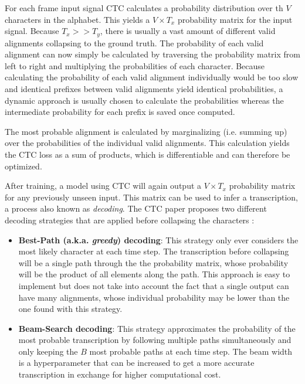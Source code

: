 For each frame input signal \ac{CTC} calculates a probability distribution over th $V$ characters in the alphabet. This yields a $V \times T_x$ probability matrix for the input signal. Because $T_x >> T_y$, there is usually a vast amount of different valid alignments collapsing to the ground truth. The probability of each valid alignment can now simply be calculated by traversing the probability matrix from left to right and multiplying the probabilities of each character. Because calculating the probability of each valid alignment individually would be too slow and identical prefixes between valid alignments yield identical probabilities, a dynamic approach is usually chosen to calculate the probabilities whereas the intermediate probability for each prefix is saved once computed.

The most probable alignment is calculated by marginalizing (i.e. summing up) over the probabilities of the individual valid alignments. This calculation yields the CTC loss as a sum of products, which is differentiable and can therefore be optimized.

After training, a model using \ac{CTC} will again output a $V \times T_x$ probability matrix for any previously unseen input. This matrix can be used to infer a transcription, a process also known as \textit{decoding}. The \ac{CTC} paper proposes two different decoding strategies that are applied before collapsing the characters \cite{ctc_paper}:

\begin{itemize}
	\item \textbf{Best-Path (a.k.a. \textit{greedy}) decoding}: This strategy only ever considers the most likely character at each time step. The transcription before collapsing will be a single path through the the probability matrix, whose probability will be the product of all elements along the path. This approach is easy to implement but does not take into account the fact that a single output can have many alignments, whose individual probability may be lower than the one found with this strategy.
	\item \textbf{Beam-Search decoding}: This strategy approximates the probability of the most probable transcription by following multiple paths simultaneously and only keeping the $B$ most probable paths at each time step. The beam width is a hyperparameter that can be increased to get a more accurate transcription in exchange for higher computational cost.
\end{itemize}

